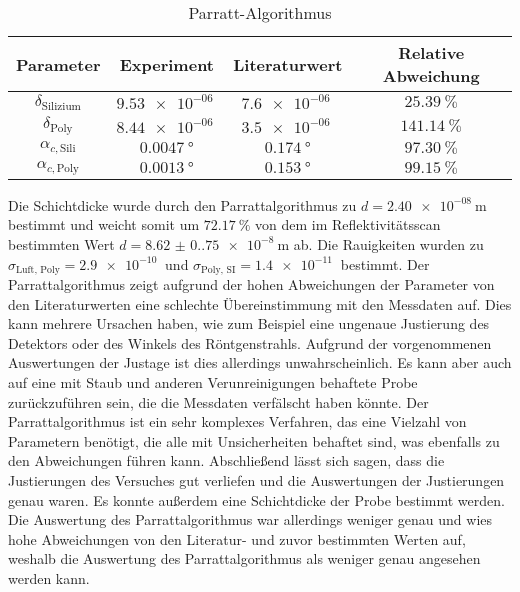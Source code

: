 \begin{table}[h!]
    \centering
    \begin{tabular}{c c c c}
        \toprule
        \textbf{Parameter} & \textbf{Experiment} & \textbf{Literaturwert} & \textbf{Relative Abweichung} \\
        \midrule
        $\delta_{\text{Silizium}}$      & $\SI{9.53e-06}{}$         & $\SI{7.6e-06}{}$         & $\SI{25.39}{\percent}$ \\ 
        $\delta_{\text{Poly}}$          & $\SI{8.44e-06}{}$         & $\SI{3.5e-06}{}$         & $\SI{141.14}{\percent}$ \\ 
        $\alpha_{c,\text{Sili}}$        & $\SI{0.0047}{\degree}$    & $\SI{0.174}{\degree}$    & $\SI{97.30}{\percent}$ \\ 
        $\alpha_{c,\text{Poly}}$        & $\SI{0.0013}{\degree}$    & $\SI{0.153}{\degree}$    & $\SI{99.15}{\percent}$ \\ 
        \bottomrule
    \end{tabular}
    \caption{Parratt-Algorithmus}
    \label{tab:parratt}
\end{table}
\noindent
Die Schichtdicke wurde durch den Parrattalgorithmus zu $d = \SI{2.40e-08}{\meter}$ bestimmt und weicht somit um $\SI{72.17}{\percent}$ von dem im Reflektivitätsscan bestimmten Wert $d = \SI{8.62(0.75)e-8}{\meter}$ ab.
Die Rauigkeiten wurden zu $\sigma_{\text{Luft, Poly}} = \SI{2.9e-10}{}$ und $\sigma_{\text{Poly, SI}} = \SI{1.4e-11}{}$ bestimmt.
Der Parrattalgorithmus zeigt aufgrund der hohen Abweichungen der Parameter von den Literaturwerten eine schlechte Übereinstimmung mit den Messdaten auf.
Dies kann mehrere Ursachen haben, wie zum Beispiel eine ungenaue Justierung des Detektors oder des Winkels des Röntgenstrahls.
Aufgrund der vorgenommenen Auswertungen der Justage ist dies allerdings unwahrscheinlich.
Es kann aber auch auf eine mit Staub und anderen Verunreinigungen behaftete Probe zurückzuführen sein, die die Messdaten verfälscht haben könnte.
Der Parrattalgorithmus ist ein sehr komplexes Verfahren, das eine Vielzahl von Parametern benötigt, die alle mit Unsicherheiten behaftet sind, was ebenfalls zu den Abweichungen führen kann. \newline
Abschließend lässt sich sagen, dass die Justierungen des Versuches gut verliefen und die Auswertungen der Justierungen genau waren.
Es konnte außerdem eine Schichtdicke der Probe bestimmt werden.
Die Auswertung des Parrattalgorithmus war allerdings weniger genau und wies hohe Abweichungen von den Literatur- und zuvor bestimmten Werten auf, weshalb die Auswertung des Parrattalgorithmus als weniger genau angesehen werden kann.